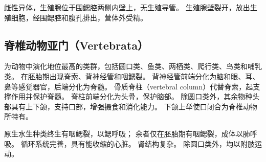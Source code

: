 \documentclass[11pt]{article}
\begin{document}
\newline

雌性异体，生殖腺位于围鳃腔两侧内壁上，无生殖导管。
生殖腺壁裂开，放出生殖细胞，经围鳃腔和腹孔排出，营体外受精。
  
\subsection{脊椎动物亚门（Vertebrata）}
为动物中演化地位最高的类群，包括圆口类、鱼类、两栖类、爬行类、鸟类和哺乳类。
在胚胎期出现脊索、背神经管和咽鳃裂。
背神经管前端分化为脑和眼、耳、鼻等感觉器官，后端分化为脊髓。
骨质脊柱（vertebral column）代替脊索，起支撑作用并保护脊髓。
脊柱前端分化为头骨，保护脑部。
除圆口类外，其余物种头部具有上下颌，支持口部，增强摄食和消化能力。
下颌上举使口闭合为脊椎动物所特有。

\newline

原生水生种类终生有咽鳃裂，以鳃呼吸；
余者仅在胚胎期有咽鳃裂，成体以肺呼吸。
循环系统完善，具有能收缩的心脏。
肾结构复杂。
除圆口类外，均以附肢运动。
\end{document}
